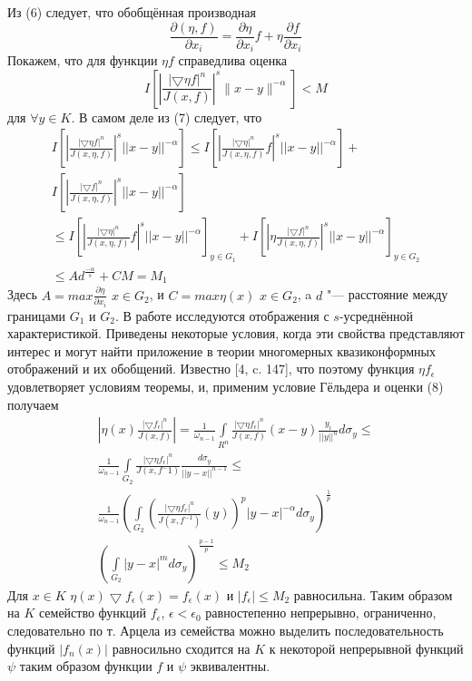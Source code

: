 Из (6) следует, что обобщённая производная
\begin{equation}
\frac{\partial(\eta,f)}{\partial x_i}=\frac{\partial\eta}{\partial x_i}f+\eta\frac{\partial f}{\partial x_i}
\end{equation}
Покажем, что для функции $\eta f$ справедлива оценка
$$
I\left[\left|\frac{|\bigtriangledown\eta f|^{n}}{J(x,f)}
\right|^{s}\|x-y\|^{-\alpha}\right]<M
$$
для $\forall y\in K$. В самом деле из (7) следует, что
\begin{multline}
I\left[\left|\frac{|\bigtriangledown\eta f|^{n}}{J(x,\eta,f)}
\right|^{s}||x-y||^{-\alpha}\right]\leq I\left[\left|\frac{|\bigtriangledown\eta|^{n}}{J(x,\eta,f)}f
\right|^{s}||x-y||^{-\alpha}\right]+\\I\left[\left|\frac{|\bigtriangledown f|^{n}}{J(x,\eta,f)}
\right|^{s}||x-y||^{-\alpha}\right]
\\
\leq I\left[\left|\frac{|\bigtriangledown\eta|^{n}}{J(x,\eta,f)}f
\right|^{s}||x-y||^{-\alpha}\right]_{y\in G_1}+I\left[\left|\eta\frac{|\bigtriangledown f|^{n}}{J(x,\eta,f)}
\right|^{s}||x-y||^{-\alpha}\right]_{y\in G_2}\\\leq Ad^{\frac{-\alpha}{s}}+CM=M_1
\end{multline}
Здесь $A=max\frac{\partial\eta}{\partial x_i}$ $x\in G_2$, и $C=max\eta(x)$ $x\in G_2$, a $d$ "--- расстояние между границами $G_1$ и $G_2$. В работе исследуются отображения с $s$-усреднённой характеристикой. Приведены некоторые условия, когда эти свойства представляют интерес и могут найти приложение в теории многомерных квазиконформных отображений и их обобщений.
 Известно [4, c. 147], что поэтому функция $\eta f_\epsilon$ удовлетворяет условиям теоремы, и, применим условие Гёльдера и оценки (8) получаем
 \begin{multline}
 \left|\eta(x)\frac{|\bigtriangledown f_\epsilon|^n}{J(x,f)}\right|=\frac{1}{\omega_{n-1}}\int\limits_{R^n}\frac{|\bigtriangledown\eta f_\epsilon|^n}{J(x,f)}(x-y)\frac{y_i}{||y||^n}d\sigma_{y}\leq
 \\
 \frac{1}{\omega_{n-1}}\int\limits_{G_2}\frac{|\bigtriangledown\eta f_\epsilon|^n}{J(x,f^-1)}\frac{d\sigma_{y}}{||y-x||^{n-1}}\leq
 \\
 \frac{1}{\omega_{n-1}}\left(\int\limits_{G_2}\left(\frac{|\bigtriangledown\eta f_\epsilon|^n}{J(x,f^{-1})}(y)\right)^p |y-x|^{-\alpha}d\sigma_y\right)^{\frac{1}{p}}\\\left(\int\limits_{G_2}|y-x|^{m}d\sigma_y\right)^{\frac{p-1}{p}}\leq M_2
\end{multline}
Для $x\in K$ $\eta(x)\bigtriangledown f_{\epsilon}(x)=f_{\epsilon}(x)$ и $|f_\epsilon|\leq M_2$ равносильна.
Таким образом на $K$ семейство функций $f_\epsilon$, $\epsilon<\epsilon_0$ равностепенно непрерывно, ограниченно, следовательно по т. Арцела из семейства можно выделить последовательность функций $|f_{n}(x)|$ равносильно сходится на $K$ к некоторой непрерывной функций $\psi$ таким образом функции $f$ и $\psi$ эквивалентны.


